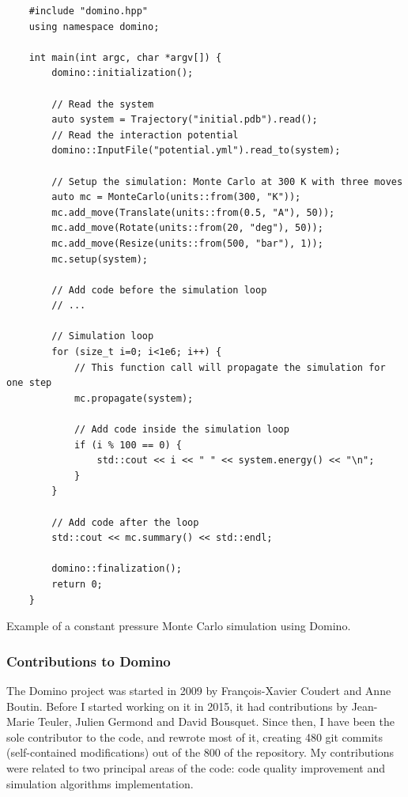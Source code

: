 \documentclass[thesis]{subfiles}
\begin{document}
\begin{listing}[ht]
    \begin{verbatim}
    #include "domino.hpp"
    using namespace domino;

    int main(int argc, char *argv[]) {
        domino::initialization();

        // Read the system
        auto system = Trajectory("initial.pdb").read();
        // Read the interaction potential
        domino::InputFile("potential.yml").read_to(system);

        // Setup the simulation: Monte Carlo at 300 K with three moves
        auto mc = MonteCarlo(units::from(300, "K"));
        mc.add_move(Translate(units::from(0.5, "A"), 50));
        mc.add_move(Rotate(units::from(20, "deg"), 50));
        mc.add_move(Resize(units::from(500, "bar"), 1));
        mc.setup(system);

        // Add code before the simulation loop
        // ...

        // Simulation loop
        for (size_t i=0; i<1e6; i++) {
            // This function call will propagate the simulation for one step
            mc.propagate(system);

            // Add code inside the simulation loop
            if (i % 100 == 0) {
                std::cout << i << " " << system.energy() << "\n";
            }
        }

        // Add code after the loop
        std::cout << mc.summary() << std::endl;

        domino::finalization();
        return 0;
    }
    \end{verbatim}
    \caption{Example of a constant pressure Monte Carlo simulation using Domino.}
    \label{code:simulation-example}
\end{listing}

\newpage
\subsubsection{Contributions to Domino}

The Domino project was started in 2009 by François-Xavier Coudert and Anne
Boutin. Before I started working on it in 2015, it had contributions by
Jean-Marie Teuler, Julien Germond and David Bousquet. Since then, I have been
the sole contributor to the code, and rewrote most of it, creating 480 git
commits (self-contained modifications) out of the 800 of the repository. My
contributions were related to two principal areas of the code: code quality
improvement and simulation algorithms implementation.
\end{document}
